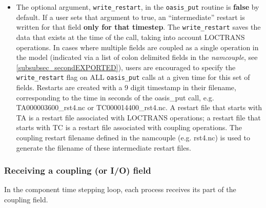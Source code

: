\begin{itemize}
This option does not put any constraint
on the order of the related {\tt oasis\_put} and {\tt oasis\_get} in the codes.

As they appear in one single entry line, these fields must share the same coupling restart file 
but this restart file may contain other fields.

\item The optional argument, {\tt write\_restart}, in the {\tt oasis\_put} routine is {\bf false} by default. 
If a user sets that argument to true, an ``intermediate'' restart is written for that field {\bf only for that timestep}. The {\tt write\_restart} 
saves the data that exists at the time of the call, taking into account LOCTRANS operations. In 
cases where multiple fields are coupled as a single operation in the model (indicated via a list of colon delimited 
fields in the {\it namcouple}, see \ref{subsubsec_secondEXPORTED}), users are encouraged to specify 
the {\tt write\_restart} flag on ALL {\tt oasis\_put} calls at a given
time for this set of fields.
Restarts are created with a 9 digit timestamp in
their filename, corresponding to the time in seconds of the oasis\_put
call, e.g. TA000003600\_rst4.nc or TC000014400\_rst4.nc. 
A restart file that starts with TA is a restart file associated
with LOCTRANS operations; a restart 
file that starts with TC is a restart file associated with
coupling operations. The coupling restart filename
defined in the namcouple (e.g. rst4.nc) is used to generate the
filename of these intermediate restart files.
\end{itemize}

\subsubsection{Receiving a coupling (or I/O) field}

In the component time stepping loop, each process receives its part of the
coupling field.

